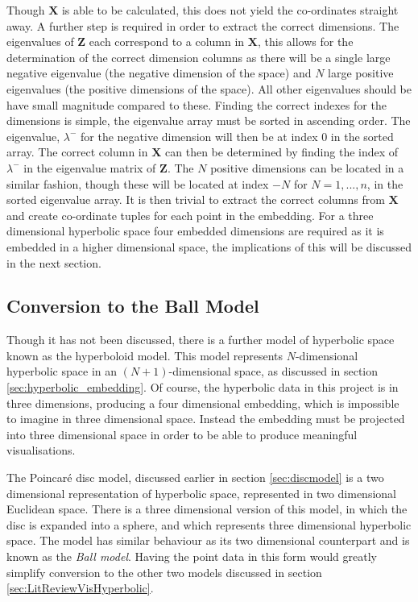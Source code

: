 Though $\boldsymbol{X}$ is able to be calculated, this does not yield the co-ordinates straight away. A further step is required in order to extract the correct dimensions. The eigenvalues of $\boldsymbol{Z}$ each correspond to a column in $\boldsymbol{X}$, this allows for the determination of the correct dimension columns as there will be a single large negative eigenvalue (the negative dimension of the space) and $N$ large positive eigenvalues (the positive dimensions of the space). All other eigenvalues should be have small magnitude compared to these. Finding the correct indexes for the dimensions is simple, the eigenvalue array must be sorted in ascending order. The eigenvalue, $\lambda^-$ for the negative dimension will then be at index 0 in the sorted array. The correct column in $\boldsymbol{X}$ can then be determined by finding the index of $\lambda^-$ in the eigenvalue matrix of $\boldsymbol{Z}$. The $N$ positive dimensions can be located in a similar fashion, though these will be located at index $-N$ for $N=1,...,n$, in the sorted eigenvalue array. It is then trivial to extract the correct columns from $\boldsymbol{X}$ and create co-ordinate tuples for each point in the embedding. For a three dimensional hyperbolic space four embedded dimensions are required as it is embedded in a higher dimensional space, the implications of this will be discussed in the next section.

\subsection{Conversion to the Ball Model}

Though it has not been discussed, there is a further model of hyperbolic space known as the hyperboloid model. This model represents $N$-dimensional hyperbolic space in an $(N+1)$-dimensional space, as discussed in section \ref{sec:hyperbolic_embedding}. Of course, the hyperbolic data in this project is in three dimensions, producing a four dimensional embedding, which is impossible to imagine in three dimensional space. Instead the embedding must be projected into three dimensional space in order to be able to produce meaningful visualisations. 

The Poincar\'{e} disc model, discussed earlier in section \ref{sec:discmodel} is a two dimensional representation of hyperbolic space, represented in two dimensional Euclidean space. There is a three dimensional version of this model, in which the disc is expanded into a sphere, and which represents three dimensional hyperbolic space. The model has similar behaviour as its two dimensional counterpart and is known as the \textit{Ball model}. Having the point data in this form would greatly simplify conversion to the other two models discussed in section \ref{sec:LitReviewVisHyperbolic}. 

